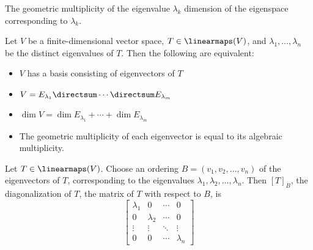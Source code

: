 \begin{definition}
  The geometric multiplicity of the eigenvalue $\lambda_k$ dimension of the eigenspace corresponding to $\lambda_k$.
\end{definition}




\begin{theorem}
  Let $V$ be a finite-dimensional vector space, $T \in \linearmaps(V)$, and $\lambda_1, \ldots, \lambda_n$ be the distinct eigenvalues of $T$. Then the following are equivalent:
  \begin{itemize}
    \item $V$ has a basis consisting of eigenvectors of $T$
    \item $V = E_{\lambda_1} \directsum \cdots \directsum E_{\lambda_m}$
    \item $\dim V = \dim E_{\lambda_1} + \cdots + \dim E_{\lambda_m}$
    \item The geometric multiplicity of each eigenvector is equal to its algebraic multiplicity.
  \end{itemize}
\end{theorem}

\begin{procedure}
  Let $T \in \linearmaps(V)$. Choose an ordering $B = (v_1, v_2, \ldots, v_n)$ of the eigenvectors of $T$, corresponding to the eigenvalues $\lambda_1, \lambda_2, \ldots, \lambda_n$. Then $[T]_B$, the diagonalization of $T$, the matrix of $T$ with respect to $B$, is
  \[
    \begin{bmatrix}
      \lambda_1 & 0 & \cdots & 0 \\
      0 & \lambda_2 & \cdots & 0 \\
      \vdots & \vdots & \ddots & \vdots \\
      0 & 0 & \cdots & \lambda_n
    \end{bmatrix}
  \]
\end{procedure}

